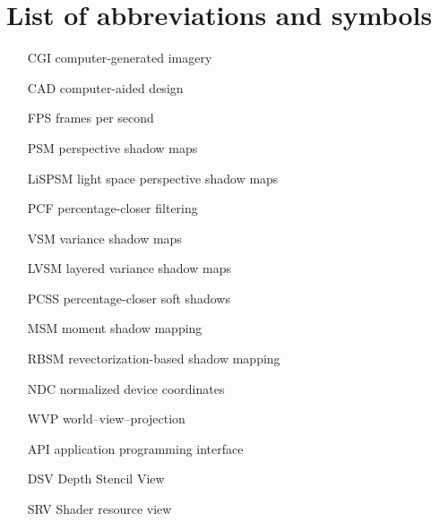 \chapter{List of abbreviations and symbols}

\begin{itemize}
\item[CGI] computer-generated imagery
\item[CAD] computer-aided design
\item[FPS] frames per second
\item[PSM] perspective shadow maps
\item[LiSPSM] light space perspective shadow maps
\item[PCF] percentage-closer filtering
\item[VSM] variance shadow maps
\item[LVSM] layered variance shadow maps
\item[PCSS] percentage-closer soft shadows
\item[MSM] moment shadow mapping
\item[RBSM] revectorization-based shadow mapping

\item[NDC] normalized device coordinates
\item[WVP] world--view--projection
\item[API] application programming interface
\item[DSV] Depth Stencil View
\item[SRV] Shader resource view

\end{itemize}